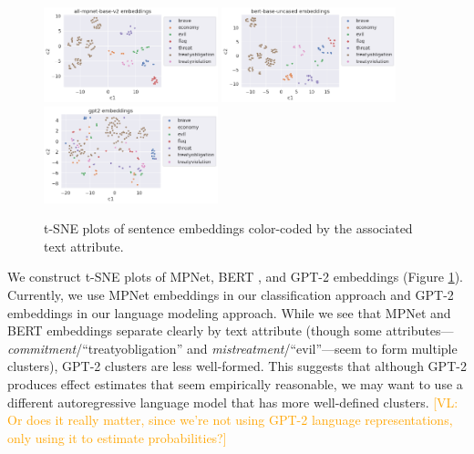 \documentclass{article}
\newcommand{\vl}[1]{\textcolor{orange}{[VL: #1]}}
\begin{document}
\begin{figure}
    \centering
    \includegraphics[width=0.45\textwidth]{plots/sanity_check/all-mpnet-base-v2.png}
    \includegraphics[width=0.45\textwidth]{plots/sanity_check/bert-base-uncased.png}
    \includegraphics[width=0.45\textwidth]{plots/sanity_check/gpt2.png}
    \caption{t-SNE plots of sentence embeddings color-coded by the associated text attribute.}
    \label{fig:alias_check}
\end{figure}

We construct t-SNE plots of MPNet, BERT \cite{devlin2019bert}, and GPT-2 embeddings (Figure \ref{fig:alias_check}). Currently, we use MPNet embeddings in our classification approach and GPT-2 embeddings in our language modeling approach. While we see that MPNet and BERT embeddings separate clearly by text attribute (though some attributes--- \textit{commitment}/``treatyobligation'' and \textit{mistreatment}/``evil''---seem to form multiple clusters), GPT-2 clusters are less well-formed. This suggests that although GPT-2 produces effect estimates that seem empirically reasonable, we may want to use a different autoregressive language model that has more well-defined clusters. \vl{Or does it really matter, since we're not using GPT-2 language representations, only using it to estimate probabilities?}
\end{document}
